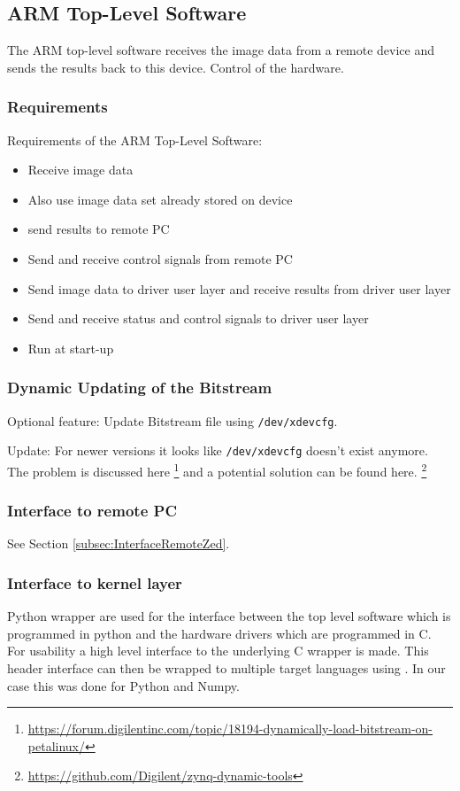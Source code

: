 \subsection{ARM Top-Level Software}
The ARM top-level software receives the image data from a remote device and sends the results back to this device. Control of the hardware.

\subsubsection{Requirements}
Requirements of the ARM Top-Level Software:
\begin{itemize} 
	\item Receive image data
	\item Also use image data set already stored on device
	\item send results to remote PC
	\item Send and receive control signals from remote PC
	\item Send image data to driver user layer and receive results from driver user layer
	\item Send and receive status and control signals to driver user layer
	\item Run at start-up 
\end{itemize}

\subsubsection{Dynamic Updating of the Bitstream}

Optional feature: Update Bitstream file using \texttt{/dev/xdevcfg}.

Update: For newer versions it looks like \texttt{/dev/xdevcfg} doesn't exist anymore. The problem is discussed here \footnote{\url{https://forum.digilentinc.com/topic/18194-dynamically-load-bitstream-on-petalinux/}} and a potential solution can be found here. \footnote{\url{https://github.com/Digilent/zynq-dynamic-tools}}

\subsubsection{Interface to remote PC}
See Section \ref{subsec:InterfaceRemoteZed}.  
\subsubsection{Interface to kernel layer}
Python wrapper are used for the interface between the top level software which is programmed in python and the hardware drivers which are programmed in C. For usability a high level interface to the underlying C wrapper is made. 
This header interface can then be wrapped to multiple target languages using \cite{Swig2020}. In our case this was done for Python and Numpy. 

